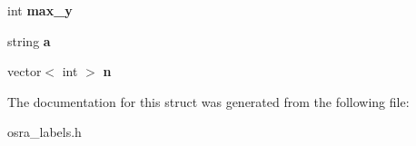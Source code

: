 \begin{DoxyCompactItemize}
\item 
\hypertarget{structlabel__s_a0371ee390789d2ce0eef120a1085cfd8}{int {\bfseries max\-\_\-y}}\label{structlabel__s_a0371ee390789d2ce0eef120a1085cfd8}

\item 
\hypertarget{structlabel__s_a6459c6c753f9d5629db00687ed66547f}{string {\bfseries a}}\label{structlabel__s_a6459c6c753f9d5629db00687ed66547f}

\item 
\hypertarget{structlabel__s_a6a10457f13a81bb0072dea89345a62b5}{vector$<$ int $>$ {\bfseries n}}\label{structlabel__s_a6a10457f13a81bb0072dea89345a62b5}

\end{DoxyCompactItemize}


The documentation for this struct was generated from the following file\-:\begin{DoxyCompactItemize}
\item 
osra\-\_\-labels.\-h\end{DoxyCompactItemize}
